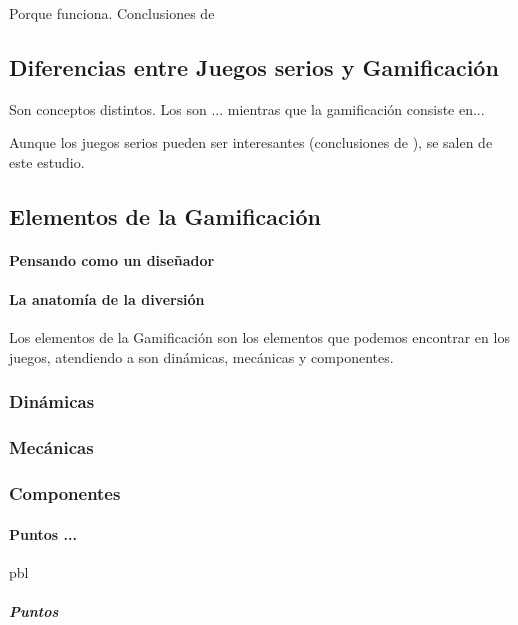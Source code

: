 \documentclass[a4paper, 12pt]{book}
\begin{document}
Porque funciona. Conclusiones de \cite{EmpiricalGamification}


\subsection{Diferencias entre Juegos serios y Gamificación}

Son conceptos distintos. Los  son \cite{GamificationDef}... mientras que la gamificación consiste en...

Aunque los juegos serios pueden ser interesantes (conclusiones de \cite{MetaSerious}), se salen de este estudio.


\subsection{Elementos de la Gamificación}

\paragraph{Pensando como un diseñador}
\paragraph{La anatomía de la diversión}

Los elementos de la Gamificación son los elementos que podemos encontrar en los juegos, atendiendo a \cite{Hunicke04mda:a} son dinámicas, mecánicas y componentes.


\subsubsection{Dinámicas}

\subsubsection{Mecánicas}

\subsubsection{Componentes}



\paragraph{Puntos ...} \gls{pbl}

\subparagraph*{Puntos}
\end{document}
